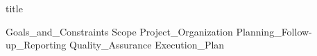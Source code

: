 \documentclass{article}
\begin{document}
{title}

\frontmatter

\tableofcontents

\listoffigures
\listoftables

\mainmatter

{Goals_and_Constraints}
{Scope}
{Project_Organization}
{Planning_Follow-up_Reporting}
{Quality_Assurance}
{Execution_Plan}

%

\newpage
\printbibliography[heading = bibintoc, title = Bibliography]    %

\end{document}
